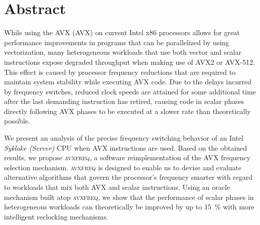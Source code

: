 \chapter{Abstract}
\label{sec:abstract}

While using the \acrlong{AVX} (\acrshort{AVX}) on current Intel \gls{x86} processors allows for great performance improvements in programs that can be parallelized by using vectorization, many heterogeneous workloads that use both vector and scalar instructions expose degraded throughput when making use of \gls{AVX2} or \gls{AVX-512}. This effect is caused by processor frequency reductions that are required to maintain system stability while executing \acrshort{AVX} code. Due to the delays incurred by frequency switches, reduced clock speeds are attained for some additional time after the last demanding instruction has retired, causing code in scalar phases directly following \acrshort{AVX} phases to be executed at a slower rate than theoretically possible.

We present an analysis of the precise frequency switching behavior of an Intel \textit{Syklake (Server)} \gls{CPU} when \acrshort{AVX} instructions are used. Based on the obtained results, we propose \textsc{avxfreq}, a software reimplementation of the \acrshort{AVX} frequency selection mechanism. \textsc{avxfreq} is designed to enable us to devise and evaluate alternative algorithms that govern the processor's frequency smarter with regard to workloads that mix both \acrshort{AVX} and scalar instructions. Using an oracle mechanism built atop \textsc{avxfreq}, we show that the performance of scalar phases in heterogeneous workloads can theoretically be improved by up to \SI{15}{\percent} with more intelligent reclocking mechanisms.